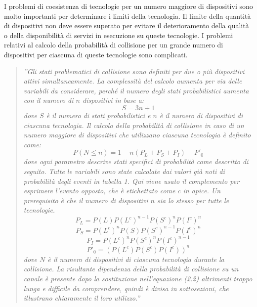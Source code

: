 \documentclass[a4paper]{report} %
\begin{document}
I problemi di coesistenza di tecnologie per un numero maggiore di dispositivi sono molto importanti per determinare i limiti della tecnologia. Il limite della quantità di dispositivi non deve essere superato per evitare il deterioramento della qualità o della disponibilità di servizi in esecuzione su queste tecnologie. 
I problemi relativi al calcolo della probabilità di collisione per un grande numero di dispositivi per ciascuna di queste tecnologie sono complicati. 
\begin{quote}
	\textit{''Gli stati problematici di collisione sono definiti per due o più dispositivi attivi simultaneamente. La complessità del calcolo aumenta per via delle variabili da considerare, perché il numero degli stati probabilistici aumenta con il numero di $n$ dispositivi in base a:
	\begin{equation}
	S = 3n + 1
	\end{equation}
	dove $S$ è il numero di stati probabilistici e $n$ è il numero di dispositivi di ciascuna tecnologia. Il calcolo della probabilità di collisione in caso di un numero maggiore di dispositivi che utilizzano ciascuna tecnologia è definito come:
	\begin{equation}
	P(N \leq n) = 1 - n(P_L + P_S + P_I) - P'_0
	\end{equation}
	dove ogni parametro descrive stati specifici di probabilità come descritto di seguito. Tutte le variabili sono state calcolate dai valori già noti di probabilità degli eventi in tabella 1. Qui viene usato il complemento per esprimere l'evento opposto, che è etichettato come $c$ in apice. Un prerequisito è che il numero di dispositivi $n$ sia lo stesso per tutte le tecnologie.
	\begin{equation}
	P_L = P(L)P(L^c)^{n-1}P(S^c)^nP(I^c)^n
	\end{equation}
	\begin{equation}
	P_S = P(L^c)^nP(S)P(S^c)^{n-1}P(I^c)^n
	\end{equation}
	\begin{equation}
	P_I = P(L^c)^nP(S^c)^nP(I^c)^{n-1}
	\end{equation}
	\begin{equation}
	P'_0 = (P(L^c)P(S^c)P(I^c))^n
	\end{equation}
	dove $N$ è il numero di dispositivi di ciascuna tecnologia durante la collisione. La risultante dipendenza della probabilità di collisione su un canale è presente dopo la sostituzione nell'equazione (2.2) altrimenti troppo lunga e difficile da comprendere, quindi è divisa in sottosezioni, che illustrano chiaramente il loro utilizzo.''}
\end{quote}
\end{document}
